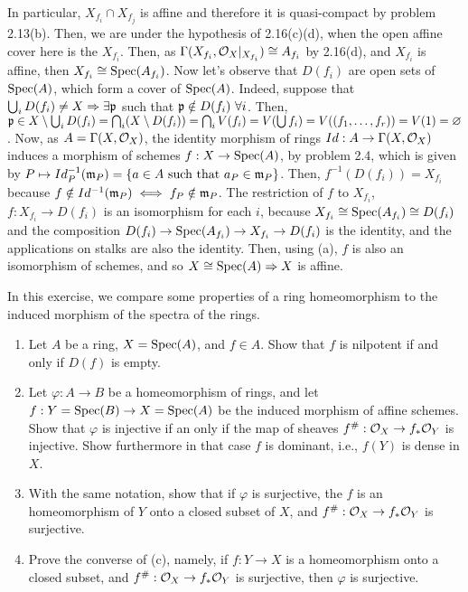 \begin{sol}
\begin{enumerate}[label=\alph*)]
		In particular, $X_{f_i} \cap X_{f_j}$ is affine and therefore it is quasi-compact by problem 2.13(b). Then, we are under the hypothesis of 2.16(c)(d), when the open affine cover here is the $X_{f_i}$. Then, as $\Gamma(X_{f_i}, \mathcal{O}_X|_{X_{f_i}}) \cong A_{f_i}$ by 2.16(d), and $X_{f_i}$ is affine, then $X_{f_i} \cong \mathrm{Spec}(A_{f_i})$. Now let's observe that $D(f_i)$ are open sets of $\mathrm{Spec}(A)$, which form a cover of $\mathrm{Spec}(A)$. Indeed, suppose that $\bigcup_{i} D(f_i) \neq X \Rightarrow \exists \mathfrak{p}$ such that $\mathfrak{p} \notin D(f_i) \, \, \forall i$. Then, $\mathfrak{p} \in X \setminus \bigcup_{i} D(f_i) = \bigcap_i (X \setminus D(f_i)) = \bigcap_i V(f_i) = V(\bigcup f_i) = V((f_1, \dots, f_r)) = V(1) = \varnothing$. Now, as $A = \Gamma(X, \mathcal{O}_X)$, the identity morphism of rings $Id: A \to \Gamma(X, \mathcal{O}_X)$ induces a morphism of schemes $f: X \to \mathrm{Spec}(A)$, by problem 2.4, which is given by $P \mapsto Id^{-1}_P(\mathfrak{m}_P) = \{a \in A \text{ such that } a_P \in \mathfrak{m}_P\}$. Then, $f^{-1}(D(f_i)) = X_{f_i}$ because $f \notin Id^{-1}(\mathfrak{m}_P) \iff f_P \notin \mathfrak{m}_P$. The restriction of $f$ to $X_{f_i}$, $f: X_{f_i} \to D(f_i)$ is an isomorphism for each $i$, because $X_{f_i} \cong \mathrm{Spec}(A_{f_i}) \cong D(f_i)$ and the composition $D(f_i) \to \mathrm{Spec}(A_{f_i}) \to X_{f_i} \to D(f_i)$ is the identity, and the applications on stalks are also the identity. Then, using (a), $f$ is also an isomorphism of schemes, and so $X \cong \mathrm{Spec}(A) \Rightarrow X$ is affine.
	\end{enumerate}
\end{sol}

\begin{ex}
	In this exercise, we compare some properties of a ring homeomorphism to the induced morphism of the spectra of the rings.
	\begin{enumerate}[label=\alph*)]
		\item Let $A$ be a ring, $X = \mathrm{Spec}(A)$, and $f \in A$. Show that $f$ is nilpotent if and only if $D(f)$ is empty.

		\item Let $\varphi: A \to B$ be a homeomorphism of rings, and let $f: Y = \mathrm{Spec}(B) \to X = \mathrm{Spec}(A)$ be the induced morphism of affine schemes. Show that $\varphi$ is injective if an only if the map of sheaves $f^{\#}: \mathcal{O}_X \to f_*\mathcal{O}_Y$ is injective. Show furthermore in that case $f$ is dominant, i.e., $f(Y)$ is dense in $X$.

		\item With the same notation, show that if $\varphi$ is surjective, the $f$ is an homeomorphism of $Y$ onto a closed subset of $X$, and $f^{\#}: \mathcal{O}_X \to f_*\mathcal{O}_Y$ is surjective.

		\item Prove the converse of (c), namely, if $f: Y \to X$ is a homeomorphism onto a closed subset, and $f^{\#}: \mathcal{O}_X \to f_*\mathcal{O}_Y$ is surjective, then $\varphi$ is surjective.
	\end{enumerate}
\end{ex}

